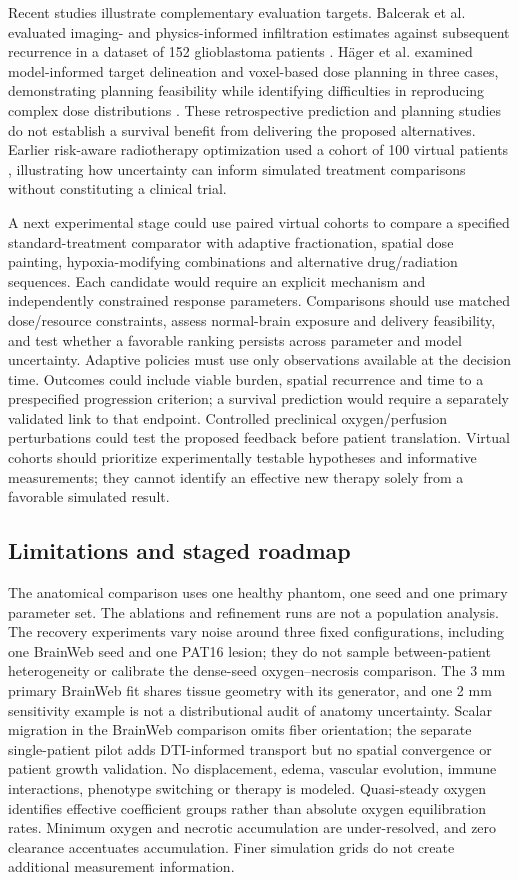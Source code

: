 Recent studies illustrate complementary evaluation targets. Balcerak et al. evaluated imaging- and physics-informed infiltration estimates against subsequent recurrence in a dataset of 152 glioblastoma patients \citep{balcerak2025}. H\"ager et al. examined model-informed target delineation and voxel-based dose planning in three cases, demonstrating planning feasibility while identifying difficulties in reproducing complex dose distributions \citep{hager2026}. These retrospective prediction and planning studies do not establish a survival benefit from delivering the proposed alternatives. Earlier risk-aware radiotherapy optimization used a cohort of 100 virtual patients \citep{chaudhuri2023}, illustrating how uncertainty can inform simulated treatment comparisons without constituting a clinical trial.

A next experimental stage could use paired virtual cohorts to compare a specified standard-treatment comparator with adaptive fractionation, spatial dose painting, hypoxia-modifying combinations and alternative drug/radiation sequences. Each candidate would require an explicit mechanism and independently constrained response parameters. Comparisons should use matched dose/resource constraints, assess normal-brain exposure and delivery feasibility, and test whether a favorable ranking persists across parameter and model uncertainty. Adaptive policies must use only observations available at the decision time. Outcomes could include viable burden, spatial recurrence and time to a prespecified progression criterion; a survival prediction would require a separately validated link to that endpoint. Controlled preclinical oxygen/perfusion perturbations could test the proposed feedback before patient translation. Virtual cohorts should prioritize experimentally testable hypotheses and informative measurements; they cannot identify an effective new therapy solely from a favorable simulated result.

\subsection{Limitations and staged roadmap}
The anatomical comparison uses one healthy phantom, one seed and one primary parameter set. The ablations and refinement runs are not a population analysis. The recovery experiments vary noise around three fixed configurations, including one BrainWeb seed and one PAT16 lesion; they do not sample between-patient heterogeneity or calibrate the dense-seed oxygen--necrosis comparison. The 3 mm primary BrainWeb fit shares tissue geometry with its generator, and one 2 mm sensitivity example is not a distributional audit of anatomy uncertainty. Scalar migration in the BrainWeb comparison omits fiber orientation; the separate single-patient pilot adds DTI-informed transport but no spatial convergence or patient growth validation. No displacement, edema, vascular evolution, immune interactions, phenotype switching or therapy is modeled. Quasi-steady oxygen identifies effective coefficient groups rather than absolute oxygen equilibration rates. Minimum oxygen and necrotic accumulation are under-resolved, and zero clearance accentuates accumulation. Finer simulation grids do not create additional measurement information.

